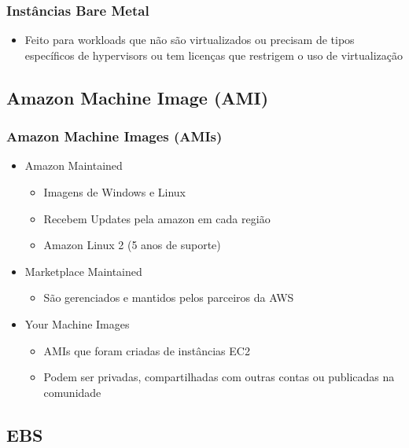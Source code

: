 \begin{frame}
	\frametitle{Instâncias Bare Metal}
	\begin{itemize}
		\item Feito para workloads que não são virtualizados ou precisam de tipos específicos de hypervisors ou tem licenças que restrigem o uso de virtualização
	\end{itemize}
\end{frame}

\subsection{Amazon Machine Image (AMI)}

\begin{frame}
	\frametitle{Amazon Machine Images (AMIs)}
	\begin{itemize}
		\item Amazon Maintained
			\begin{itemize}
				\item Imagens de Windows e Linux
				\item Recebem Updates pela amazon em cada região
				\item Amazon Linux 2 (5 anos de suporte)
			\end{itemize}
		\item Marketplace Maintained
			\begin{itemize}
				\item São gerenciados e mantidos pelos parceiros da AWS
			\end{itemize}
		\item Your Machine Images
			\begin{itemize}
				\item AMIs que foram criadas de instâncias EC2
				\item Podem ser privadas, compartilhadas com outras contas ou publicadas na comunidade
			\end{itemize}
	\end{itemize}
\end{frame}

\subsection{EBS}

